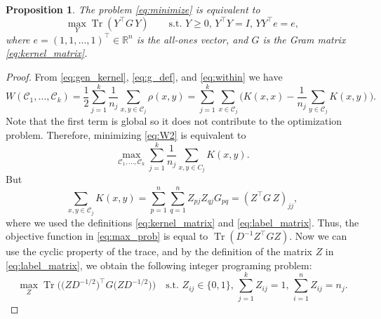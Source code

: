 \documentclass[aps,preprint,nofootinbib,floatfix]{revtex4-1}
\newtheorem{proposition}[theorem]{Proposition}
\DeclareMathOperator{\Tr}{Tr}
\newcommand\kk{K}
\newcommand\C{{\mathcal{C}}}
\newcommand\Zt{Y}
\newcommand\e{e}
\begin{document}
\begin{proposition} 
\label{th:qcqp2}
The problem \eqref{eq:minimize} is equivalent to
\begin{equation}
\label{eq:qcqp2}
\max_{\Zt} \Tr \left( \Zt^\top G \, \Zt \right)  \qquad
\mbox{s.t. $\Zt \ge 0$, $\Zt^\top \Zt = I$, 
$\Zt \Zt^\top \e = \e$},
\end{equation}
where $\e = (1,1,\dots,1)^\top \in \mathbb{R}^n$ is the all-ones vector,
and $G$ is the Gram matrix \eqref{eq:kernel_matrix}.
\end{proposition}
\begin{proof}
From 
\eqref{eq:gen_kernel},
\eqref{eq:g_def}, and
\eqref{eq:within}
we have
\begin{equation}
\label{eq:W2}
W(\C_1,\dotsc,\C_k  )
= \dfrac{1}{2} \sum_{j=1}^k \dfrac{1}{n_j} \sum_{x,y \in \C_j} \rho(x,y)
= \sum_{j=1}^k \sum_{x \in \C_j}  \bigg(
\kk(x,x) - \dfrac{1}{n_j} \sum_{y \in \C_j} \kk(x,y) \bigg).
\end{equation}
Note that the first term is global so it does not contribute to the 
optimization problem.
Therefore, minimizing \eqref{eq:W2} is equivalent to
\begin{equation}
\label{eq:max_prob}
\max_{ \C_1,\dotsc,\C_k } 
\sum_{j=1}^k \dfrac{1}{n_j} \sum_{x,y\in C_j} \kk(x,y) .
\end{equation}
But 
\begin{equation}
\sum_{x, y \in \C_j} \kk(x, y) =
\sum_{p=1}^{n} \sum_{q=1}^{n} Z_{pj} Z_{qj} G_{pq} = 
(Z^\top G \, Z)_{jj},
\end{equation}
where we used the definitions \eqref{eq:kernel_matrix} and
\eqref{eq:label_matrix}. Thus, the objective function in 
\eqref{eq:max_prob} is equal to
$\Tr \left( D^{-1} Z^\top G Z \right)$. 
Now we can
use the cyclic property
of the trace, and by the definition of the matrix $Z$
in \eqref{eq:label_matrix}, we obtain the following integer
programing problem:
\begin{equation}\label{eq:qcqp}
\max_{Z} \Tr\Big( \big( Z D^{-1/2}\big)^\top G 
\big( ZD^{-1/2} \big) 
\Big) \quad
\mbox{s.t. $Z_{ij} \in \{0,1\}$, $\sum_{j=1}^k Z_{ij} = 1$, 
$\sum_{i=1}^n Z_{ij} = n_j$.}
\end{equation}


\end{proof}
\end{document}
